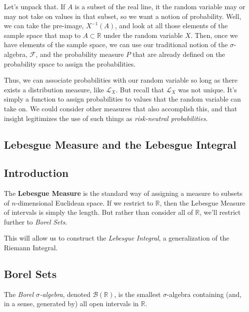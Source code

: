 \documentclass[a4paper,12pt]{article}
\theoremstyle{plain}
\theoremstyle{definition}
\theoremstyle{remark}
\begin{document}
Let's unpack that. If $A$ is a subset of the real line, it the random variable may or may not take on values in that subset, so we want
a notion of probability.  Well, we can take the pre-image, $X^{-1}(A)$, and look at all those elements of the sample space that map to
$A \subset \mathbb{R}$ under the random variable $X$.  Then, once we have elements of the sample space, we can use our traditional notion
of the $\sigma$-algebra, $\mathcal{F}$, and the probability measure $P$ that are already defined on the probability space to assign
the probabilities.

Thus, we can associate probabilities with our random variable so long as there exists a distribution measure, like $\mathcal{L}_X$.
But recall that $\mathcal{L}_X$ was not unique.  It's simply a function to assign probabilities to values that the random variable can
take on.  We could consider other measures that also accomplish this, and that insight legitimizes the use of such things as
\emph{risk-neutral probabilities}.

\subsection{Lebesgue Measure and the Lebesgue Integral}

\subsection{Introduction}

The \textbf{Lebesgue Measure} is the standard way of assigning a measure to subsets of $n$-dimensional Euclidean space.  If we restrict
to $\mathbb{R}$, then the Lebesgue Measure of intervals is simply the length. But rather than consider all of $\mathbb{R}$, we'll
restrict further to \emph{Borel Sets}.

This will allow us to construct the \emph{Lebesgue Integral}, a generalization of the Riemann Integral.

\subsection{Borel Sets}

The \emph{Borel $\sigma$-algebra}, denoted $\mathcal{B}(\mathbb{R})$, is the smallest $\sigma$-algebra containing (and, in a sense,
generated by) all open intervals
in $\mathbb{R}$.
\end{document}
